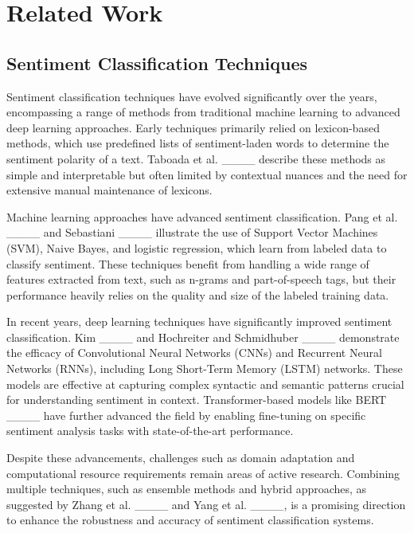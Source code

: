 \section{Related Work}
\label{Related Work}


\subsection{Sentiment Classification Techniques}

Sentiment classification techniques have evolved significantly over the years, encompassing a range of methods from traditional machine learning to advanced deep learning approaches. Early techniques primarily relied on lexicon-based methods, which use predefined lists of sentiment-laden words to determine the sentiment polarity of a text. Taboada et al. ____ describe these methods as simple and interpretable but often limited by contextual nuances and the need for extensive manual maintenance of lexicons.

Machine learning approaches have advanced sentiment classification. Pang et al. ____ and Sebastiani ____ illustrate the use of Support Vector Machines (SVM), Naive Bayes, and logistic regression, which learn from labeled data to classify sentiment. These techniques benefit from handling a wide range of features extracted from text, such as n-grams and part-of-speech tags, but their performance heavily relies on the quality and size of the labeled training data.

In recent years, deep learning techniques have significantly improved sentiment classification. Kim ____ and Hochreiter and Schmidhuber ____ demonstrate the efficacy of Convolutional Neural Networks (CNNs) and Recurrent Neural Networks (RNNs), including Long Short-Term Memory (LSTM) networks. These models are effective at capturing complex syntactic and semantic patterns crucial for understanding sentiment in context. Transformer-based models like BERT ____ have further advanced the field by enabling fine-tuning on specific sentiment analysis tasks with state-of-the-art performance. 


Despite these advancements, challenges such as domain adaptation and computational resource requirements remain areas of active research. Combining multiple techniques, such as ensemble methods and hybrid approaches, as suggested by Zhang et al. ____ and Yang et al. ____, is a promising direction to enhance the robustness and accuracy of sentiment classification systems.


